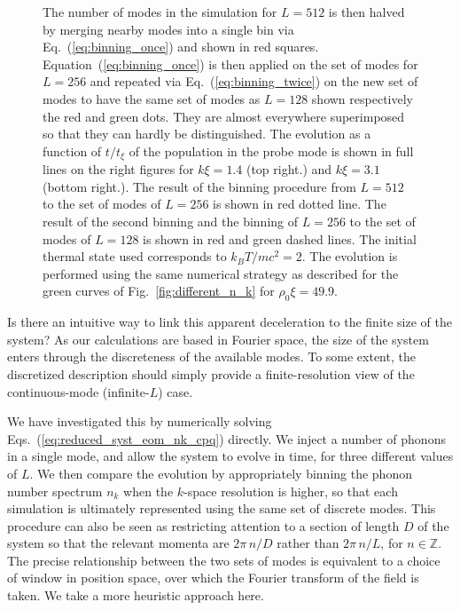 \documentclass[aps,prd,notitlepage,amsfonts,amssymb,amsmath,nofootinbib,superscriptaddress,longbibliography]{revtex4-2}
\begin{document}
\begin{appendices}
\begin{figure}
{    The number of modes in the simulation for $L=512$ is then halved by merging nearby modes into a single bin via Eq.~(\ref{eq:binning_once}) and shown in red squares. Equation~(\ref{eq:binning_once}) is then applied on the set of modes for $L=256$ and repeated via Eq.~(\ref{eq:binning_twice}) on the new set of modes to have the same set of modes as $L=128$ shown respectively the red and green dots. They are almost everywhere superimposed so that they can hardly be distinguished.
    The evolution as a function of $t/t_{\xi}$ of the population in the probe mode is shown in full lines on the right figures for $k \xi = 1.4$ (top right.) and $k \xi = 3.1$ (bottom right.). The result of the binning procedure from $L=512$ to the set of modes of $L=256$ is shown in red dotted line. The result of the second binning and the binning of $L=256$ to the set of modes of $L=128$ is shown in red and green dashed lines.
    The initial thermal state used corresponds to $k_{B} T/ m c^2=2$. The evolution is performed using the same numerical strategy as described for the green curves of Fig.~\ref{fig:different_n_k} for  $\rho_0 \xi = 49.9$.
    \label{fig:decay_nk_different_L_binning} }
\end{figure}


Is there an intuitive way to link this apparent deceleration to the finite size of the system?
As our calculations are based in Fourier space, the size of the system enters through the discreteness of the available modes. To some extent, the discretized description should simply provide a finite-resolution view of the continuous-mode (infinite-$L$) case.

We have investigated this by numerically solving Eqs.~(\ref{eq:reduced_syst_eom_nk_cpq}) directly.   We inject a number of phonons in a single mode, and allow the system to evolve in time, for three different values of $L$.  We then compare the evolution by appropriately binning the phonon number spectrum $n_{k}$ when the $k$-space resolution is higher, so that each simulation is ultimately represented using the same set of discrete modes. 
This procedure can also be seen as restricting attention to a section of length $D$ of the system so that the relevant momenta are $2 \pi \, n/ D$ rather than $2 \pi\, n/ L$, for $n \in \mathbb{Z}$. The precise relationship between the two sets of modes is equivalent to a choice of window  in position space, over which the Fourier transform of the field is taken. We take a more heuristic approach here.


\end{appendices}
\end{document}
